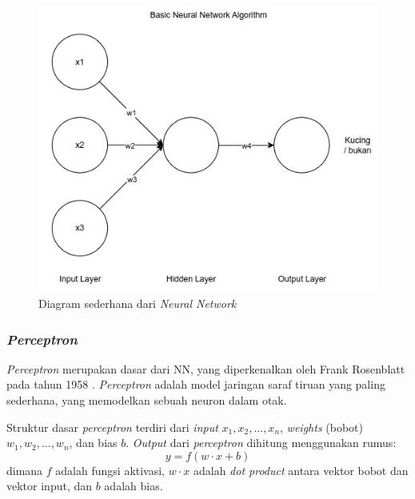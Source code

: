 \begin{figure}[H]
  \centering
  \includegraphics[scale=0.6]{gambar/bab2-basic-nn.jpeg}
  \caption{Diagram sederhana dari \emph{Neural Network}}
  \label{fig:basic_nn}
\end{figure}

\subsubsection{\emph{Perceptron}}
\emph{Perceptron} merupakan dasar dari NN, yang diperkenalkan oleh Frank Rosenblatt pada tahun 1958 \parencite*{rosenblatt1958perceptron}. \emph{Perceptron} adalah model jaringan saraf tiruan yang paling sederhana, yang memodelkan sebuah neuron dalam otak.

Struktur dasar \emph{perceptron} terdiri dari \emph{input} \( x_1, x_2, \dots, x_n \), \emph{weights} (bobot) \( w_1, w_2, \dots, w_n \), dan bias \( b \). \emph{Output} dari \emph{perceptron} dihitung menggunakan rumus:
\[ y = f(w \cdot x + b) \]
dimana \( f \) adalah fungsi aktivasi, \( w \cdot x \) adalah \emph{dot product} antara vektor bobot dan vektor input, dan \( b \) adalah bias.
 

